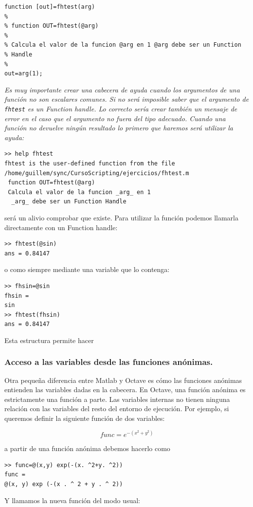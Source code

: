 \begin{verbatim}
function [out]=fhtest(arg)
%
% function OUT=fhtest(@arg)
%
% Calcula el valor de la funcion @arg en 1 @arg debe ser un Function
% Handle
%
out=arg(1);
\end{verbatim}
\emph{Es muy importante crear una cabecera de ayuda cuando los
  argumentos de una función no son escalares comunes. Si no será
  imposible saber que el argumento de} \texttt{\emph{fhtest}} \emph{es
  un Function handle.  Lo correcto sería crear también un mensaje de
  error en el caso que el argumento no fuera del tipo adecuado. Cuando
  una función no devuelve ningún resultado lo primero que haremos será
  utilizar la ayuda:}

\begin{verbatim}
>> help fhtest
fhtest is the user-defined function from the file
/home/guillem/sync/CursoScripting/ejercicios/fhtest.m
 function OUT=fhtest(@arg)
 Calcula el valor de la funcion _arg_ en 1
  _arg_ debe ser un Function Handle
\end{verbatim}
será un alivio comprobar que existe.  Para utilizar la función podemos
llamarla directamente con un Function handle:

\begin{verbatim}
>> fhtest(@sin)
ans = 0.84147
\end{verbatim}
o como siempre mediante una variable que lo contenga:

\begin{verbatim}
>> fhsin=@sin
fhsin =
sin
>> fhtest(fhsin)
ans = 0.84147
\end{verbatim}
Esta estructura permite hacer


\subsubsection{Acceso a las variables desde las funciones anónimas.}

Otra pequeña diferencia entre Matlab y Octave es cómo las funciones
anónimas entienden las variables dadas en la cabecera. En Octave, una
función anónima es estrictamente una función a parte. Las variables
internas no tienen ninguna relación con las variables del resto del
entorno de ejecución. Por ejemplo, si queremos definir la siguiente
función de dos variables:

$$func=e^{-(x^{2}+y^{2})}$$

a partir de una función anónima debemos hacerlo como

\begin{verbatim}
>> func=@(x,y) exp(-(x. ^2+y. ^2)) 
func =
@(x, y) exp (-(x . ^ 2 + y . ^ 2)) 
\end{verbatim}
Y llamamos la nueva función del modo usual:

